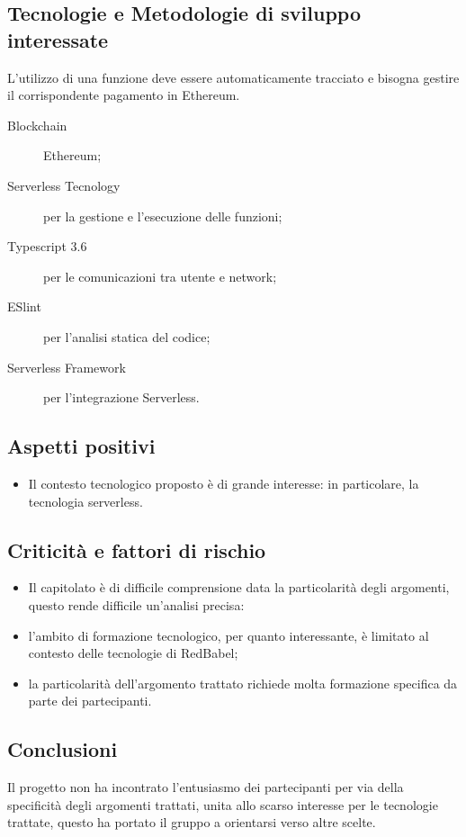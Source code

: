\documentclass[../studio-di-fattibilita.tex]{subfiles}
\begin{document}
	\subsection{Tecnologie e Metodologie di sviluppo interessate}
	\label{subsec:tecnologie_interessate}
    L'utilizzo di una funzione deve essere automaticamente tracciato e bisogna gestire il corrispondente pagamento in Ethereum.	
	\begin{description}
		\item[Blockchain] Ethereum;
		\item[Serverless Tecnology] per la gestione e l'esecuzione delle funzioni;
		\item[Typescript 3.6] per le comunicazioni tra utente e network;
		\item[ESlint] per l'analisi statica del codice;
		\item[Serverless Framework] per l'integrazione Serverless.
	\end{description}
	\subsection{Aspetti positivi}
	\label{subsec:aspetti_positivi}
	\begin{itemize}
		\item Il contesto tecnologico proposto è di grande interesse: in particolare, la tecnologia serverless.
	\end{itemize}
	\subsection{Criticità e fattori di rischio}
	\label{subsec:criticita_e_fattori_di_rischio}
	\begin{itemize}
		\item Il capitolato è di difficile comprensione data la particolarità degli argomenti, questo rende difficile un'analisi precisa:
		\item l'ambito di formazione tecnologico, per quanto interessante, è limitato al contesto delle tecnologie di RedBabel;
		\item la particolarità dell'argomento trattato richiede molta formazione specifica da parte dei partecipanti.
	\end{itemize}
	\subsection{Conclusioni}
	\label{subsec:conclusioni}
	Il progetto non ha incontrato l'entusiasmo dei partecipanti per via della specificità degli argomenti trattati, unita allo scarso interesse per le tecnologie trattate, questo ha portato il gruppo a orientarsi verso altre scelte.
\end{document}
